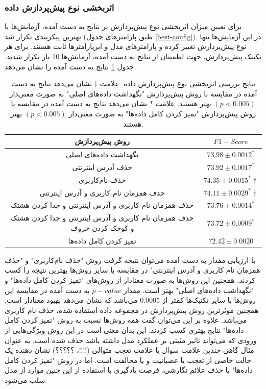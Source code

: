 \subsubsection{اثربخشی نوع پیش‌پردازش داده}\label{sec:data-cleaning-impact}
برای تعیین میزان اثربخشی نوع پیش‌پردازش بر نتایج به دست آمده، آزمایش‌ها با بهترین پیکربندی تکرار شد (طبق پارامترهای جدول
\ref{best-config}).
در این آزمایش‌ها تنها نوع پیش‌پردارش تغییر کرده و پارامترهای مدل و ابرپارامترها ثابت هستند. برای هر تکنیک پیش‌پردازش، جهت اطمینان از نتایج به دست آمده، آزمایش‌ها 10 بار تکرار شدند. جدول
\ref{data-cleaning-impact}
نتایج به دست آمده را نشان می‌دهد.

\begin{table}[h!]
	\centering
	\small
	\caption[نتایج بررسی اثربخشی نوع پیش‌پردازش داده]
	{\label{data-cleaning-impact}
		نتایج بررسی اثربخشی نوع پیش‌پردازش داده. 
		علامت $\dagger$ نشان می‌دهد نتایج به دست آمده در مقایسه با روش پیش‌پردازش "نگهداشت داده‌های اصلی" به صورت معنی‌دار $(p < 0.005)$ بهتر هستند. علامت $\ast$ نشان‌ می‌دهد نتایج به دست آمده در مقایسه با روش پیش‌پردازش "تمیز کردن کامل داده‌ها" به صورت معنی‌دار $(p < 0.005)$ بهتر هستند.}
	
	\vspace{0.3cm}
	\begin{tabular}{c  |c }
		\hline
		روش پیش‌پردازش &
		 $F1-Score$
		 \\
		\hline
		نگهداشت داده‌های اصلی & $73.98 \pm 0.0012 ^\ast$\\
		حذف آدرس‌ اینترنتی & $73.92 \pm 0.0017 ^\ast$\\ 
		حذف نام‌کاربری & \textbf{$74.35 \pm 0.0015 ^\ast \dagger$} \\
		حذف همزمان نام کاربری و آدرس اینترنتی & $74.11 \pm 0.0029 ^\ast \dagger$\\
		حذف همزمان نام کاربری و آدرس اینترنتی و جدا کردن هشتک & $73.76 \pm 0.0014 ^\ast$\\
		حذف همزمان نام کاربری و آدرس اینترنتی و جدا کردن هشتک و کوچک کردن حروف
		 & $73.72 \pm 0.0009 ^\ast$\\
		تمیز کردن کامل داده‌ها
		 & $72.42 \pm 0.0020 $\\
		\hline
		\hline
	\end{tabular}	
\end{table}

 با ارزیابی مقدار
به دست آمده می‌توان نتیجه گرفت روش "حذف نام‌کاربری" و "حذف همزمان نام کاربری و آدرس اینترنتی" در مقایسه با سایر روش‌ها بهترین نتیجه را کسب کردند. همچنین این روش‌ها به صورت معنادار از روش‌های "تمیز کردن کامل داده‌ها" و "نگهداشت داده‌های اصلی" بهتر است. مقدار $p-value$ به دست آمده در مقایسه این روش‌ها با سایر تکنیک‌ها کمتر از $0.0005$ می‌باشد که نشان می‌دهد بهبود معنادار
است. همچنین موثرترین روش پیش‌پردازش در مجموعه داده استفاده شده، حذف نام کاربری می‌باشد. علاوه بر این می‌توان گفت همه روش‌ها نسبت به روش "تمیز کردن کامل داده‌ها" نتایج بهتری کسب کردند. این بدان معنی است در این روش‌ ویژگی‌هایی
 از ورودی که می‌تواند تاثیر مثبتی بر عملکرد مدل داشته باشد حذف شده است. به عنوان مثال گاهی چندین علامت سوال یا علامت تعجب متوالی (!!!!، ؟؟؟؟؟) نشان دهنده یک حالت خاصی از تعجب یا عصبانیت و یا مخالفت است. اما در روش "تمیز کردن کامل داده‌ها"  با حذف علائم نگارشی، فرصت یادگیری با استفاده از این چنین موارد از مدل سلب می‌شود.

